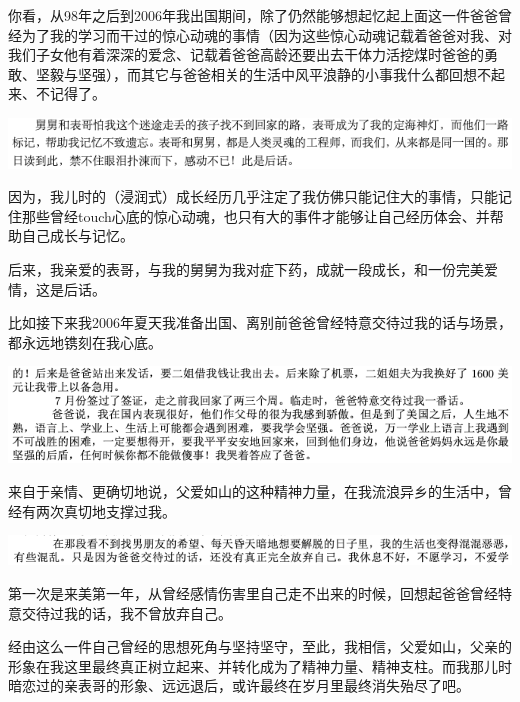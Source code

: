 \documentclass[9pt, b5paper]{article}
\begin{document}
你看，从98年之后到2006年我出国期间，除了仍然能够想起忆起上面这一件爸爸曾经为了我的学习而干过的惊心动魂的事情（因为这些惊心动魂记载着爸爸对我、对我们子女他有着深深的爱念、记载着爸爸高龄还要出去干体力活挖煤时爸爸的勇敢、坚毅与坚强），而其它与爸爸相关的生活中风平浪静的小事我什么都回想不起来、不记得了。

\begin{center}
\includegraphics[width=.9\linewidth]{./pic/backups_plans_20210422_231039.png}
\end{center}

因为，我儿时的（浸润式）成长经历几乎注定了我仿佛只能记住大的事情，只能记住那些曾经touch心底的惊心动魂，也只有大的事件才能够让自己经历体会、并帮助自己成长与记忆。

后来，我亲爱的表哥，与我的舅舅为我对症下药，成就一段成长，和一份完美爱情，这是后话。

比如接下来我2006年夏天我准备出国、离别前爸爸曾经特意交待过我的话与场景，都永远地镌刻在我心底。 

\begin{center}
\includegraphics[width=.9\linewidth]{./pic/backups_plans_20210422_175337.png}
\end{center}

来自于亲情、更确切地说，父爱如山的这种精神力量，在我流浪异乡的生活中，曾经有两次真切地支撑过我。 

\begin{center}
\includegraphics[width=.9\linewidth]{./pic/backups_plans_20210422_180014.png}
\end{center}

第一次是来美第一年，从曾经感情伤害里自己走不出来的时候，回想起爸爸曾经特意交待过我的话，我不曾放弃自己。

经由这么一件自己曾经的思想死角与坚持坚守，至此，我相信，父爱如山，父亲的形象在我这里最终真正树立起来、并转化成为了精神力量、精神支柱。而我那儿时暗恋过的亲表哥的形象、远远退后，或许最终在岁月里最终消失殆尽了吧。
\end{document}

